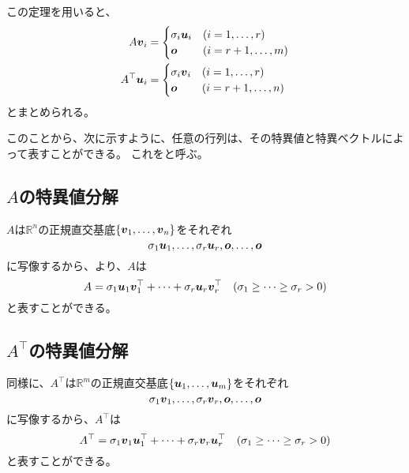 \documentclass[../../../topic_linear-algebra]{subfiles}
\begin{document}
\br

この定理を用いると、
\begin{align*}
  A\vb*{v}_i       & = \begin{cases}
                         \sigma_i \vb*{u}_i & (i = 1,\ldots,r)   \\
                         \vb*{o}            & (i = r+1,\ldots,m)
                       \end{cases}  \\
  A^\top \vb*{u}_i & = \begin{cases}
                         \sigma_i \vb*{v}_i & (i = 1,\ldots, r)   \\
                         \vb*{o}            & (i = r+1,\ldots, n)
                       \end{cases}
\end{align*}
とまとめられる。

\br

このことから、次に示すように、任意の行列は、その特異値と特異ベクトルによって表すことができる。
これをと呼ぶ。

\subsection{$A$の特異値分解}\label{sec:svd-of-A}

$A$は$\mathbb{R}^n$の正規直交基底$\{ \vb*{v}_1, \ldots, \vb*{v}_n \}$をそれぞれ
\begin{equation*}
  \sigma_1\vb*{u}_1,\ldots,\sigma_r\vb*{u}_r,\vb*{o},\ldots,\vb*{o}
\end{equation*}
に写像するから、より、$A$は
\begin{equation*}
  A = \sigma_1\vb*{u}_1\vb*{v}_1^\top + \cdots + \sigma_r \vb*{u}_r \vb*{v}_r^\top \quad (\sigma_1 \geq \cdots \geq \sigma_r > 0)
\end{equation*}
と表すことができる。

\subsection{$A^\top$の特異値分解}\label{sec:svd-of-transpose-A}

同様に、$A^\top$は$\mathbb{R}^m$の正規直交基底$\{ \vb*{u}_1, \ldots, \vb*{u}_m\}$をそれぞれ
\begin{equation*}
  \sigma_1\vb*{v}_1, \ldots, \sigma_r\vb*{v}_r,\vb*{o},\ldots,\vb*{o}
\end{equation*}
に写像するから、$A^\top$は
\begin{equation*}
  A^\top = \sigma_1\vb*{v}_1\vb*{u}_1^\top + \cdots + \sigma_r \vb*{v}_r \vb*{u}_r^\top \quad (\sigma_1 \geq \cdots \geq \sigma_r > 0)
\end{equation*}
と表すことができる。
\end{document}
